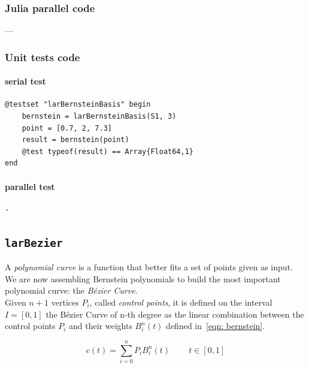 \documentclass[a4paper,11pt]{article}
\begin{document}
\subsubsection{Julia parallel code}
---

\subsubsection{Unit tests code}

\paragraph{serial test}
\begin{verbatim}
@testset "larBernsteinBasis" begin
    bernstein = larBernsteinBasis(S1, 3)
    point = [0.7, 2, 7.3]
    result = bernstein(point)
    @test typeof(result) == Array{Float64,1}
end
\end{verbatim}

\paragraph{parallel test}
\begin{verbatim}
-
\end{verbatim}

\subsection{\texttt{larBezier}}
A \emph{polynomial curve} is a function that better fits a set of points given as input.
We are now assembling Bernstein polynomials to build the most important polynomial curve: the \emph{B\'ezier Curve}. \\
Given $n+1$ vertices $P_i$, called \emph{control points}, it is defined on the interval $I=[0,1]$ the B\'ezier Curve of n-th degree as the linear combination between the control points $P_i$ and their weights $B_i^n(t)$ defined in~\eqref{eqn: bernstein}.

\begin{equation*}
c(t)=\sum_{i=0}^nP_i B_i^n(t) \;\;\;\;\;\;\;\; t\in [0,1]
\end{equation*}
\end{document}
